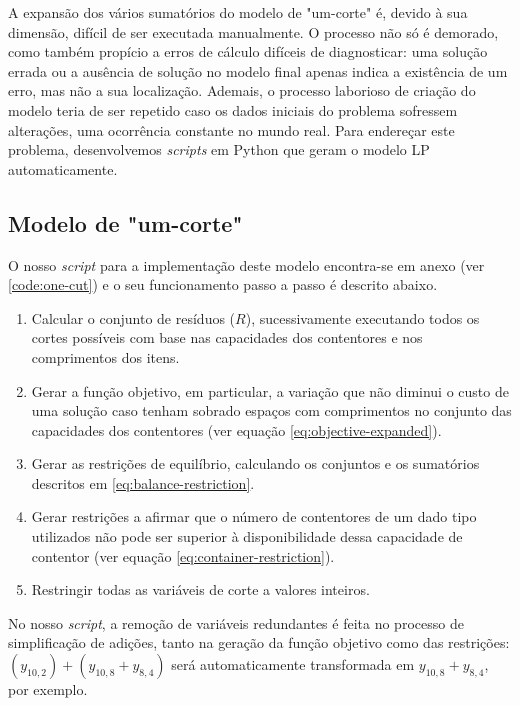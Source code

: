 \documentclass[12pt, a4paper, titlepage]{article}
\begin{document}
A expansão dos vários sumatórios do modelo de "um-corte"{} é, devido à sua dimensão, difícil de ser
executada manualmente. O processo não só é demorado, como também propício a erros de cálculo
difíceis de diagnosticar: uma solução errada ou a ausência de solução no modelo final apenas indica
a existência de um erro, mas não a sua localização. Ademais, o processo laborioso de criação do
modelo teria de ser repetido caso os dados iniciais do problema sofressem alterações, uma ocorrência
constante no mundo real. Para endereçar este problema, desenvolvemos \emph{scripts} em Python que
geram o modelo LP automaticamente.

\subsection{Modelo de "um-corte"{}}

O nosso \emph{script} para a implementação deste modelo encontra-se em anexo (ver
\ref{code:one-cut}) e o seu funcionamento passo a passo é descrito abaixo.

\begin{enumerate}
    \item Calcular o conjunto de resíduos ($R$), sucessivamente executando todos os cortes possíveis
        com base nas capacidades dos contentores e nos comprimentos dos itens.

    \item Gerar a função objetivo, em particular, a variação que não diminui o custo de uma solução
        caso tenham sobrado espaços com comprimentos no conjunto das capacidades dos contentores
        (ver equação \ref{eq:objective-expanded}).

    \item Gerar as restrições de equilíbrio, calculando os conjuntos e os sumatórios descritos em
        \eqref{eq:balance-restriction}.

    \item Gerar restrições a afirmar que o número de contentores de um dado tipo utilizados não pode
        ser superior à disponibilidade dessa capacidade de contentor (ver equação
        \ref{eq:container-restriction}).

    \item Restringir todas as variáveis de corte a valores inteiros.
\end{enumerate}

No nosso \emph{script}, a remoção de variáveis redundantes é feita no processo de simplificação de
adições, tanto na geração da função objetivo como das restrições:
$(y_{10, 2}) + (y_{10, 8} + y_{8, 4})$ será automaticamente transformada em $y_{10, 8} + y_{8, 4}$,
por exemplo.
\end{document}
